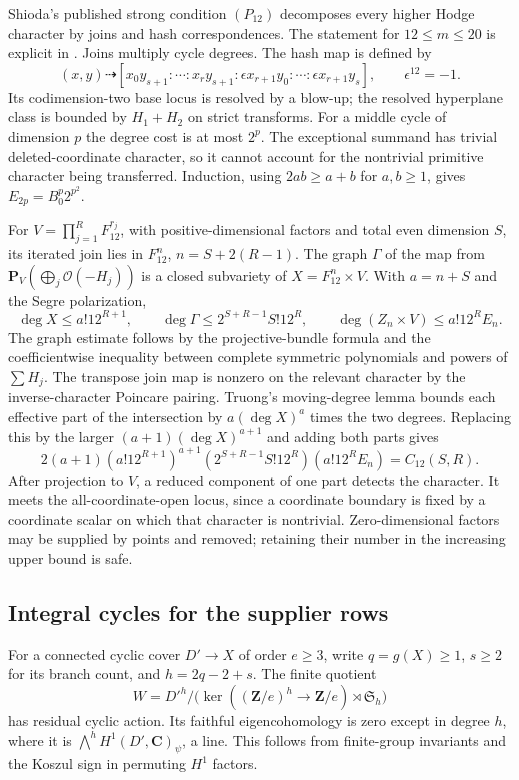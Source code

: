 \documentclass[11pt]{article}
\theoremstyle{definition}
\theoremstyle{remark}
\begin{document}
Shioda's published strong condition $(P_{12})$ decomposes every higher
Hodge character by joins and hash correspondences.  The statement for
$12\le m\le20$ is explicit in \cite[p.~182; Theorems~I--IV]{ShiodaFermat}.
Joins multiply cycle degrees.  The hash map is defined by
\[
 (x,y)\dashrightarrow
 [x_0y_{s+1}:\cdots:x_ry_{s+1}:
   \epsilon x_{r+1}y_0:\cdots:\epsilon x_{r+1}y_s],
 \qquad\epsilon^{12}=-1.
\]
Its codimension-two base locus is resolved by a blow-up; the resolved
hyperplane class is bounded by $H_1+H_2$ on strict transforms.
For a middle cycle of dimension $p$ the degree cost is at most $2^p$.
The exceptional summand has trivial deleted-coordinate character, so
it cannot account for the nontrivial primitive character being
transferred.  Induction, using $2ab\ge a+b$ for $a,b\ge1$, gives
$E_{2p}=B_0^p2^{p^2}$.

For $V=\prod_{j=1}^RF_{12}^{r_j}$, with positive-dimensional factors
and total even dimension $S$, its iterated join lies in
$F_{12}^n$, $n=S+2(R-1)$.
The graph $\Gamma$ of the map from
$\mathbf P_V(\bigoplus_j\mathcal O(-H_j))$ is a closed subvariety of
$X=F_{12}^n\times V$.  With $a=n+S$ and the Segre polarization,
\[
 \deg X\le a!12^{R+1},\qquad
 \deg\Gamma\le2^{S+R-1}S!12^R,\qquad
 \deg(Z_n\times V)\le a!12^R E_n.
\]
The graph estimate follows by the projective-bundle formula and the
coefficientwise inequality between complete symmetric polynomials and
powers of $\sum H_j$.  The transpose join map is nonzero on the
relevant character by the inverse-character Poincare pairing.
Truong's moving-degree lemma \cite[Lemma~2.2]{TruongMoving} bounds each effective part of the
intersection by $a(\deg X)^a$ times the two degrees.
Replacing this by the larger $(a+1)(\deg X)^{a+1}$ and adding both
parts gives
\[
 2(a+1)(a!12^{R+1})^{a+1}
 (2^{S+R-1}S!12^R)(a!12^R E_n)=C_{12}(S,R).
\]
After projection to $V$, a reduced component of one part detects the
character.  It meets the all-coordinate-open locus, since a coordinate
boundary is fixed by a coordinate scalar on which that character is
nontrivial.  Zero-dimensional factors may be supplied by points and
removed; retaining their number in the increasing upper bound is safe.

\subsection{Integral cycles for the supplier rows}

For a connected cyclic cover $D'\to X$ of order $e\ge3$, write
$q=g(X)\ge1$, $s\ge2$ for its branch count, and $h=2q-2+s$.
The finite quotient
\[
 W=D'^h/\bigl(\ker((\mathbf Z/e)^h\to\mathbf Z/e)
                         \rtimes\mathfrak S_h\bigr)
\]
has residual cyclic action.  Its faithful eigencohomology is zero
except in degree $h$, where it is
$\bigwedge^hH^1(D',\mathbf C)_\psi$, a line.
This follows from finite-group invariants and the Koszul sign in
permuting $H^1$ factors.
\end{document}
